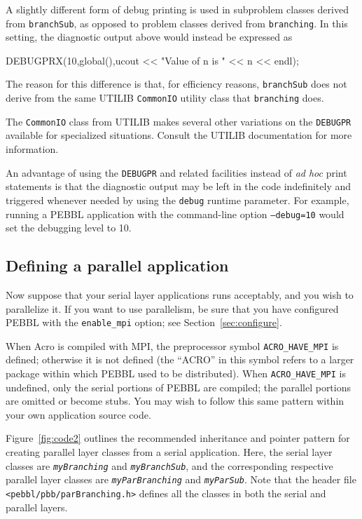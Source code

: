 A slightly different form of debug printing is used in subproblem
classes derived from \texttt{branchSub}, as opposed to problem classes
derived from \texttt{branching}.  In this setting, the diagnostic
output above would instead be expressed as
\begin{codeblock}
DEBUGPRX(10,global(),ucout << "Value of n is " << n << endl);
\end{codeblock}
The reason for this difference is that, for efficiency reasons,
\texttt{branchSub} does not derive from the same UTILIB
\texttt{CommonIO} utility class that \texttt{branching} does.  

The \texttt{CommonIO} class from UTILIB makes several other variations
on the \texttt{DEBUGPR} available for specialized situations.  Consult
the UTILIB documentation for more information.

An advantage of using the \texttt{DEBUGPR} and related facilities
instead of \emph{ad hoc} print statements is that the diagnostic
output may be left in the code indefinitely and triggered whenever
needed by using the \texttt{debug} runtime parameter.  For example,
running a PEBBL application with the command-line option
\texttt{--debug=10} would set the debugging level to 10.  

\subsection{Defining a parallel application}
\label{sec:parMethods}
Now suppose that your serial layer applications runs acceptably, and you wish
to parallelize it.  If you want to use parallelism, be sure that you have
configured PEBBL with the \texttt{enable\_mpi} option; see
Section~\ref{sec:configure}.

When Acro is compiled with MPI, the preprocessor symbol
\texttt{ACRO\_HAVE\_MPI} is defined; otherwise it is not defined (the ``ACRO''
in this symbol refers to a larger package within which PEBBL used to be
distributed). When \texttt{ACRO\_HAVE\_MPI} is undefined, only the serial
portions of PEBBL are compiled; the parallel portions are omitted or become
stubs.  You may wish to follow this same pattern within your own application
source code.

Figure~\ref{fig:code2} outlines the
recommended inheritance and pointer pattern for creating parallel
layer classes from a serial application.  Here, the serial layer
classes are \texttt{\emph{myBranching}} and
\texttt{\emph{myBranchSub}}, and the corresponding 
respective parallel layer classes
are \texttt{\emph{myParBranching}} and \texttt{\emph{myParSub}}.  Note
that the header file \texttt{<pebbl/pbb/parBranching.h>} defines all the
classes in both the serial and parallel layers.  

